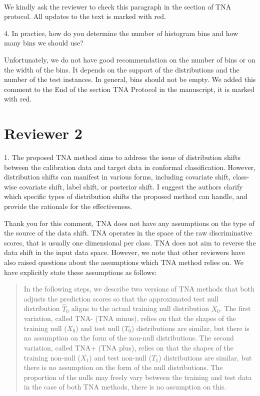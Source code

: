 \documentclass{article}
\newcommand{\response}[1]{\vspace*{1ex} \color{blue} \noindent #1 \color{black}
\vspace*{2ex}}
\newcommand{\edit}[1]{\begin{quotation}\color{red}\noindent #1
\color{black}\end{quotation}}
\begin{document}
\ 

\response{We kindly ask the reviewer to check this paragraph in the section of TNA protocol. All updates to the text is marked with red.}


4. In practice, how do you determine the number of histogram bins and how many bins we should use?

\response{Unfortunately, we do not have good recommendation on the number of bins or on the width of the bins. It depends on the support of the distributions and the number of the test instances. In general, bins should not be empty. We added this comment to the End of the section TNA Protocol in the manuscript, it is marked with red. }

\clearpage 

\section*{Reviewer 2}
1. The proposed TNA method aims to address the issue of distribution shifts between the calibration data and target data in conformal classification.
However, distribution shifts can manifest in various forms, including covariate shift, class-wise covariate shift, label shift, or posterior shift.
I suggest the authors clarify which specific types of distribution shifts the proposed method can handle, and provide the rationale for the effectiveness.

\response{Thank you for this comment, TNA does not have any assumptions on the type of the source of the data shift. TNA operates in the space of the raw discriminative scores, that is usually one dimensional per class. TNA does not aim to reverse the data shift in the input data space. However, we note that other reviewers have also raised questions about the assumptions which TNA method relies on. We have explicitly state these assumptions as follows:}


\edit{ In the following steps, we describe two versions of TNA methods that both adjusts the prediction scores so that the approximated test null distribution $\hat{T}_0$ aligns to the actual training null distribution $X_0$. The first variation, called TNA- (TNA minus), relies on that the shapes of the training null ($X_0$) and test null ($T_0$) distributions are similar, but there is no assumption on the form of the non-null distributions. The second variation, called TNA+ (TNA plus), relies on that the shapes of the training non-null ($X_1$) and test non-null ($T_1$) distributions are similar, but there is no assumption on the form of the null distributions. The proportion of the nulls may freely vary between the training and test data in the case of both TNA methods, there is no assumption on this.
}
\end{document}
